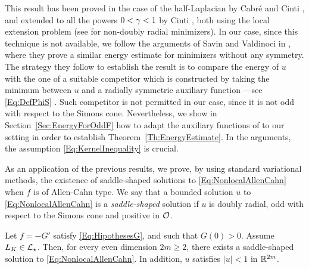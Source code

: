 This result has been proved in the case of the half-Laplacian by Cabré and Cinti \cite{CabreCinti-EnergyHalfL}, and extended to all the powers $0<\gamma<1$ by Cinti \cite{Cinti-Saddle2}, both using the local extension problem (see \cite{CabreCinti-SharpEnergy} for non-doubly radial minimizers). In our case, since this technique is not available, we follow the arguments of Savin and Valdinoci in \cite{SavinValdinoci-EnergyEstimate}, where they prove a similar energy estimate for minimizers without any symmetry. The strategy they follow to establish the result is to compare the energy of $u$ with the one of a suitable competitor which is constructed by taking the minimum between $u$ and a radially symmetric auxiliary function ---see \eqref{Eq:DefPhiS} . Such competitor is not permitted in our case, since it is not odd with respect to the Simons cone. Nevertheless, we show in Section~\ref{Sec:EnergyForOddF} how to adapt the auxiliary functions of \cite{SavinValdinoci-EnergyEstimate} to our setting in order to establish Theorem~\ref{Th:EnergyEstimate}. In the arguments, the assumption \eqref{Eq:KernelInequality} is crucial.


As an application of the previous results, we prove, by using standard variational methods, the existence of saddle-shaped solutions to  \eqref{Eq:NonlocalAllenCahn} when $f$ is of Allen-Cahn type. We say that a bounded solution $u$ to \eqref{Eq:NonlocalAllenCahn} is a \emph{saddle-shaped} solution if $u$ is doubly radial, odd with respect to the Simons cone and positive in $\mathcal{O}$. 

\begin{theorem}
	\label{Th:Existence}
    Let $f=-G'$ satisfy \eqref{Eq:HipothesesG}, and such that $G(0)>0$. Assume $L_K\in \mathcal{L}_\star$. Then, for every even dimension $2m \geq 2$, there exists a saddle-shaped solution to \eqref{Eq:NonlocalAllenCahn}. In addition, $u$ satisfies $|u|<1$ in $\mathbb{R}^{2m}$.
\end{theorem}

